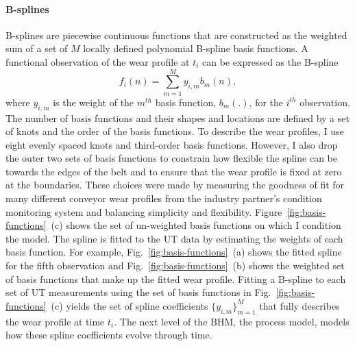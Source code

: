 \paragraph{B-splines}
B-splines are piecewise continuous functions \citep[p.~33-38]{ramsay_2009} that are constructed as the weighted sum of a set of $M$ locally defined polynomial B-spline basis functions. A functional observation of the wear profile at $t_i$ can be expressed as the B-spline
\begin{equation}
 f_i(n) = \sum_{m = 1}^{M} y_{i, m}b_m(n),
 \label{eq:spline}
\end{equation}
where $y_{i, m}$ is the weight of the $m^{th}$ basis function, $b_m(.)$, for the $i^{th}$ observation. The number of basis functions and their shapes and locations are defined by a set of knots and the order of the basis functions. To describe the wear profiles, I use eight evenly spaced knots and third-order basis functions. However, I also drop the outer two sets of basis functions to constrain how flexible the spline can be towards the edges of the belt and to ensure that the wear profile is fixed at zero at the boundaries. These choices were made by measuring the goodness of fit for many different conveyor wear profiles from the industry partner's condition monitoring system and balancing simplicity and flexibility. Figure~\ref{fig:basis-functions}~(c) shows the set of un-weighted basis functions on which I condition the model. The spline is fitted to the UT data by estimating the weights of each basis function. For example, Fig.~\ref{fig:basis-functions}~(a) shows the fitted spline for the fifth observation and Fig.~\ref{fig:basis-functions}~(b) shows the weighted set of basis functions that make up the fitted wear profile. Fitting a B-spline to each set of UT measurements using the set of basis functions in Fig.~\ref{fig:basis-functions}~(c) yields the set of spline coefficients $\{y_{i, m}\}^M_{m = 1}$ that fully describes the wear profile at time $t_i$. The next level of the BHM, the process model, models how these spline coefficients evolve through time.

